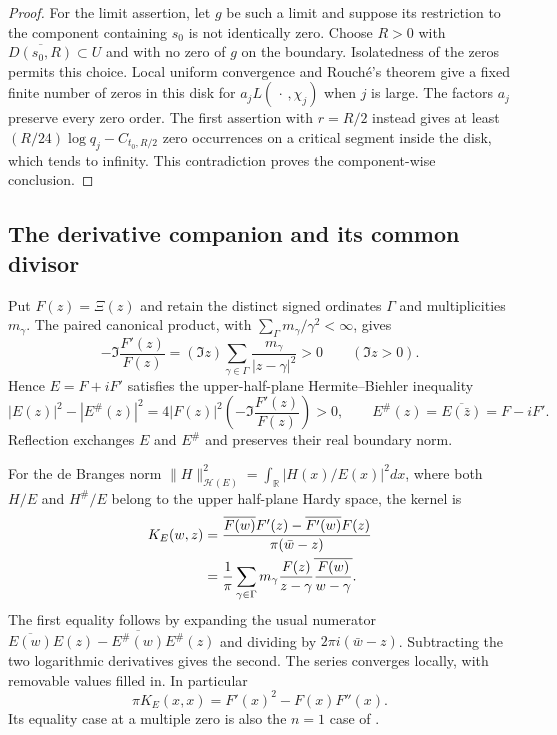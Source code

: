 \begin{proof}
For the limit assertion, let $g$ be such a limit and suppose
its restriction to the component containing $s_0$ is not
identically zero. Choose $R>0$ with
$\overline{D(s_0,R)}\subset U$ and with no zero of $g$ on
the boundary. Isolatedness of the zeros permits this choice.
Local uniform convergence and Rouch\'e's theorem give a
fixed finite number of zeros in this disk for
$a_jL(\,\cdot\,,\chi_j)$ when $j$ is large. The factors
$a_j$ preserve every zero order. The first assertion with
$r=R/2$ instead gives at least
$(R/24)\log q_j-C_{t_0,R/2}$ zero occurrences on a critical
segment inside the disk, which tends to infinity. This
contradiction proves the component-wise conclusion.
\end{proof}

\subsection{The derivative companion and its common divisor}
\label{subsec:hb-boundary}
Put $F(z)=\Xi(z)$ and retain the distinct signed ordinates
$\Gamma$ and multiplicities $m_\gamma$. The paired canonical
product, with $\sum_\Gamma m_\gamma/\gamma^2<\infty$, gives
\[
 -\Im\frac{F'(z)}{F(z)}
 =(\Im z)\sum_{\gamma\in\Gamma}
          \frac{m_\gamma}{|z-\gamma|^2}>0
 \qquad(\Im z>0).
\]
Hence $E=F+iF'$ satisfies the upper-half-plane
Hermite--Biehler inequality
\[
 |E(z)|^2-|E^\#(z)|^2
  =4|F(z)|^2\left(-\Im\frac{F'(z)}{F(z)}\right)>0,
 \qquad E^\#(z)=\overline{E(\bar z)}=F-iF'.
\]
Reflection exchanges $E$ and $E^\#$ and preserves their
real boundary norm.

For the de Branges norm
$\|H\|_{\mathcal H(E)}^2=\int_{\mathbb R}|H(x)/E(x)|^2dx$,
where both $H/E$ and $H^\#/E$ belong to the upper
half-plane Hardy space, the kernel is
\begin{align}
 K_E(w,z)
 &=\frac{\overline{F(w)}F'(z)-\overline{F'(w)}F(z)}
                {\pi(\bar w-z)}\notag\\
 &=\frac1\pi\sum_{\gamma\in\Gamma}m_\gamma
       \frac{F(z)}{z-\gamma}
       \overline{\frac{F(w)}{w-\gamma}}.             \label{eq:hb-kernel}
\end{align}
The first equality follows by expanding the usual numerator
$\overline{E(w)}E(z)-\overline{E^\#(w)}E^\#(z)$ and dividing
by $2\pi i(\bar w-z)$. Subtracting the two logarithmic
derivatives gives the second. The series converges locally,
with removable values filled in. In particular
\begin{equation}\label{eq:hb-laguerre}
 \pi K_E(x,x)=F'(x)^2-F(x)F''(x).
\end{equation}
Its equality case at a multiple zero is also the $n=1$
case of \cite[Theorem~1.3 and Section~4, pp.~3, 10--12]{sra-xi2026}.


